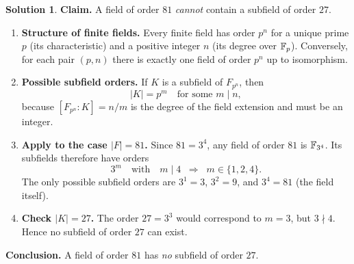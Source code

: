 \documentclass[12pt]{article}
\theoremstyle{definition} %
\newtheorem{solution}{Solution}
\theoremstyle{plain} %
\begin{document}
        \begin{solution}
          \textbf{Claim.} A field of order \(81\) \emph{cannot} contain a subfield of order \(27\).
          
          \medskip
          \begin{enumerate}[label=\textbf{Step \arabic*:}, leftmargin=*]
          
            \item \textbf{Structure of finite fields.}  
                  Every finite field has order \(p^{n}\) for a unique prime \(p\) (its
                  characteristic) and a positive integer \(n\) (its degree over
                  \(\Bbb F_{p}\)).  Conversely, for each pair \((p,n)\) there is exactly
                  one field of order \(p^{n}\) up to isomorphism.
          
            \item \textbf{Possible subfield orders.}  
                  If \(K\) is a subfield of \(F_{p^{n}}\), then
                  \[
                    |K|=p^{m}\quad\text{for some }m\mid n,
                  \]
                  because \([F_{p^{n}}:K]=n/m\) is the degree of the field extension and
                  must be an integer.
          
            \item \textbf{Apply to the case \(|F|=81\).}  
                  Since \(81=3^{4}\), any field of order \(81\) is
                  \(\Bbb F_{3^{4}}\).  Its subfields therefore have orders
                  \[
                    3^{m}
                    \quad\text{with}\quad
                    m \mid 4 \;\;\Longrightarrow\;\; m\in\{1,2,4\}.
                  \]
                  The only possible subfield orders are \(3^{1}=3\), \(3^{2}=9\), and
                  \(3^{4}=81\) (the field itself).
          
            \item \textbf{Check \(|K|=27\).}  
                  The order \(27=3^{3}\) would correspond to \(m=3\), but
                  \(3\nmid4\).  Hence no subfield of order \(27\) can exist.
          
          \end{enumerate}
          
          \medskip
          \textbf{Conclusion.}  A field of order \(81\) has \emph{no} subfield of
          order \(27\).
          \end{solution}
\end{document}
